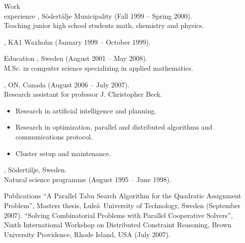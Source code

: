 \documentclass{../../cls/cv}
\begin{document}
\begin{category}{Work \\experience}
, S\"odert\"alje Municipality (Fall 1999 --
Spring 2000). \\
Teaching junior high school students math, chemistry and physics.

, KA1 Waxholm (January 1999 -- October 1999).
\end{category}

\begin{category}{Education}
, Sweden (August 2001 -- May 2008).\\
M.Sc. in computer science specializing in applied mathematics.

, ON, Canada (August 2006 -- July 2007). \\
Research assistant for professor J. Christopher Beck.
\begin{itemize}
   \item Research in artificial intelligence and planning.
   \item Research in optimization, parallel and distributed algorithms and communications protocol.
   \item Cluster setup and maintenance.
\end{itemize}

, S\"odert\"alje, Sweden.\\
Natural science programme (August 1995 -- June 1998).
\end{category}

\begin{category}{Publications}
\citembullet ``A Parallel Tabu Search Algorithm for the Quadratic Assignment Problem'', Masters thesis, Lule\aa\ University of Technology, Sweden (September 2007).
\citembullet ``Solving Combinatorial Problems with Parallel Cooperative Solvers'', Ninth International
Workshop on Distributed Constraint Reasoning, Brown University Providence, Rhode Island, USA (July 2007).
\end{category}
\end{document}
